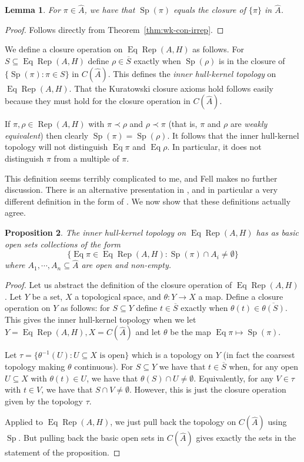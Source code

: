 \documentclass[a4paper,11pt]{article}
\newcommand{\Rep}{\operatorname{Rep}}
\newcommand{\Eq}{\operatorname{Eq}}
\newcommand{\Sp}{\operatorname{Sp}}
\newtheorem{lemma}{Lemma}[section]
\newtheorem{proposition}[lemma]{Proposition}
\begin{document}
\begin{lemma}\label{lem:supp_in_dual_A}
For $\pi\in\hat A$, we have that $\Sp(\pi)$ equals the closure of $\{\pi\}$
in $\hat A$.
\end{lemma}
\begin{proof}
Follows directly from Theorem~\ref{thm:wk-con-irrep}.
\end{proof}

We define a closure operation on $\Eq\Rep(A,H)$ as follows.  For $S\subseteq
\Eq\Rep(A,H)$ define $\rho\in\overline{S}$ exactly when $\Sp(\rho)$ is in the
closure of $\{\Sp(\pi) : \pi\in S\}$ in $C(\hat A)$.  This defines the
\emph{inner hull-kernel topology} on $\Eq\Rep(A,H)$.  That the Kuratowski
closure axioms hold follows easily because they must hold for the closure
operation in $C(\hat A)$.

If $\pi,\rho\in\Rep(A,H)$ with $\pi\prec\rho$ and $\rho\prec\pi$ (that is,
$\pi$ and $\rho$ are \emph{weakly equivalent}) then clearly $\Sp(\pi)=\Sp(\rho)$.
It follows that the inner hull-kernel topology will not distinguish $\Eq\pi$
and $\Eq\rho$.  In particular, it does not distinguish $\pi$ from a multiple
of $\pi$.

This definition seems terribly complicated to me, and Fell makes no further
discussion.  There is an alternative presentation in \cite[Chapter~5]{kan},
and in particular a very different definition in the form of
\cite[Definition~5.5]{kan}.  We now show that these definitions actually agree.

\begin{proposition}\label{prop:inner_hk_top}
The inner hull-kernel topology on $\Eq\Rep(A,H)$ has as basic open
sets collections of the form
\[ \{\Eq\pi\in\Eq\Rep(A,H) : \Sp(\pi) \cap A_i\not=\emptyset \} \]
where $A_1,\cdots,A_n\subseteq \hat A$ are open and non-empty.
\end{proposition}
\begin{proof}
Let us abstract the definition of the closure operation of $\Eq\Rep(A,H)$.
Let $Y$ be a set, $X$ a topological space, and $\theta:Y\rightarrow X$ a map.
Define a closure operation on $Y$ as follows: for $S\subseteq Y$ define
$t\in\overline{S}$ exactly when $\theta(t) \in \overline{\theta(S)}$.
This gives the inner hull-kernel topology when we let $Y=\Eq\Rep(A,H), 
X=C(\hat A)$ and let $\theta$ be the map $\Eq\pi \mapsto \Sp(\pi)$.

Let $\tau=\{\theta^{-1}(U) : U\subseteq X \text{ is open}\}$ which is a
topology on $Y$ (in fact the coarsest topology making $\theta$ continuous).
For $S\subseteq Y$ we have that $t\in\overline{S}$ when, for any open $U\subseteq 
X$ with $\theta(t)\in U$, we have that $\theta(S)\cap U\not=\emptyset$.
Equivalently, for any $V\in\tau$ with $t\in V$, we have that $S\cap V\not=
\emptyset$.  However, this is just the closure operation given by the topology
$\tau$.

Applied to $\Eq\Rep(A,H)$, we just pull back the topology on $C(\hat A)$
using $\Sp$.  But pulling back the basic open sets in $C(\hat A)$ gives exactly
the sets in the statement of the proposition.
\end{proof}
\end{document}
